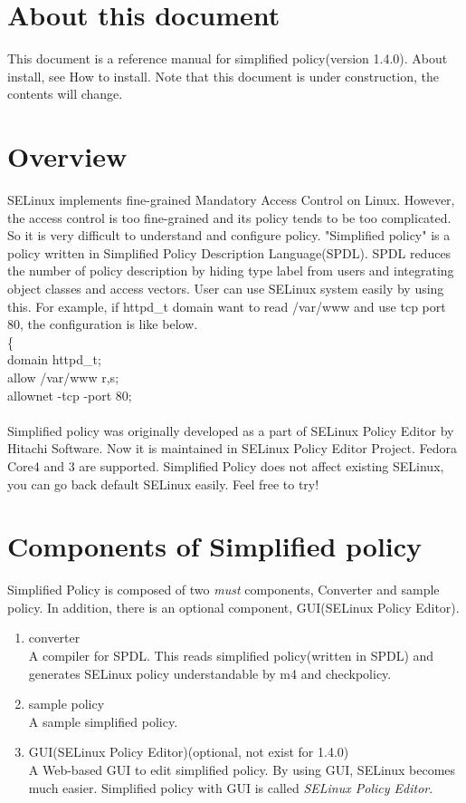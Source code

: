 \section{About this document}
 This document is a reference manual for simplified policy(version 1.4.0). About install, see How
to install.  Note that this document is under construction, the contents
will change.

\section{Overview}
  SELinux\cite{selinux} implements fine-grained Mandatory Access Control
  on Linux. However, the access control is too fine-grained and its
  policy tends to be too complicated. So it is very difficult to understand and configure policy.
  "Simplified policy" is a policy written in Simplified Policy Description
  Language(SPDL). SPDL reduces the number of policy
  description by hiding type label from users and integrating object
  classes and access vectors. User can use SELinux system easily by
  using this. For example, if httpd\_t domain want to read /var/www and
  use tcp port 80, the configuration is like below.\\
\{\\
domain httpd\_t;\\
allow /var/www r,s;\\
allownet -tcp -port 80;\\
\\
  Simplified policy was originally developed as a part of SELinux Policy
  Editor\cite{selpepaper}\cite{selpetalk} by Hitachi
  Software\cite{hitachisoft}. Now it is maintained in SELinux Policy
  Editor Project\cite{selpehomepage}. Fedora Core4 and 3 are supported.  Simplified Policy does not affect existing SELinux, you can go back default SELinux easily. Feel free to try! 

\section{Components of Simplified policy}
Simplified Policy is composed of two {\it must} components,
Converter and sample policy. In addition, there is an optional component, GUI(SELinux Policy Editor).

\begin{enumerate}
\item converter \\
 A compiler for SPDL. This reads simplified
      policy(written in SPDL) and generates SELinux policy understandable by m4 and checkpolicy.
\item sample policy\\
 A sample simplified policy. 

\item GUI(SELinux Policy Editor)(optional, not exist for 1.4.0)\\
 A Web-based GUI to edit simplified policy. 
        By using GUI, SELinux becomes much easier. Simplified policy with
      GUI is called {\it SELinux Policy Editor}.
\end{enumerate}

